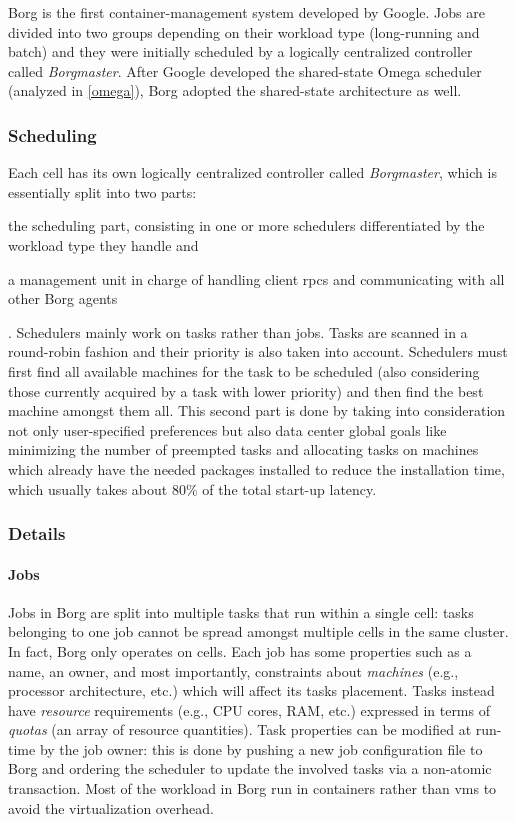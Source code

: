 Borg \cite{borg} is the first container-management system developed by Google.
Jobs are divided into two groups depending on their workload type (long-running and batch) and they were initially scheduled by a logically centralized controller called \textit{Borgmaster}.
After Google developed the shared-state Omega \cite{omega} scheduler (analyzed in \autoref{omega}), Borg \cite{borg} adopted the shared-state architecture as well.

\subsubsection{Scheduling}
Each cell has its own logically centralized controller called \textit{Borgmaster}, which is essentially split into two parts:
\begin{mylist}
    \item the scheduling part, consisting in one or more schedulers differentiated by the workload type they handle and
    \item a management unit in charge of handling client \glspl{rpc} and communicating with all other Borg \cite{borg} agents
\end{mylist}.
Schedulers mainly work on tasks rather than jobs.
Tasks are scanned in a round-robin fashion and their priority is also taken into account.
Schedulers must first find all available machines for the task to be scheduled (also considering those currently acquired by a task with lower priority) and then find the best machine amongst them all.
This second part is done by taking into consideration not only user-specified preferences but also data center global goals like minimizing the number of preempted tasks and allocating tasks on machines which already have the needed packages installed to reduce the installation time, which usually takes about 80\% of the total start-up latency.

\subsubsection{Details}

\paragraph{Jobs}
Jobs in Borg \cite{borg} are split into multiple tasks that run within a single cell: tasks belonging to one job cannot be spread amongst multiple cells in the same cluster.
In fact, Borg \cite{borg} only operates on cells.
Each job has some properties such as a name, an owner, and most importantly, constraints about \textit{machines} (e.g., processor architecture, etc.) which will affect its tasks placement.
Tasks instead have \textit{resource} requirements (e.g., CPU cores, RAM, etc.) expressed in terms of \textit{quotas} (an array of resource quantities).
Task properties can be modified at run-time by the job owner: this is done by pushing a new job configuration file to Borg \cite{borg} and ordering the scheduler to update the involved tasks via a non-atomic transaction.
Most of the workload in Borg \cite{borg} run in containers rather than \glspl{vm} to avoid the virtualization overhead.

